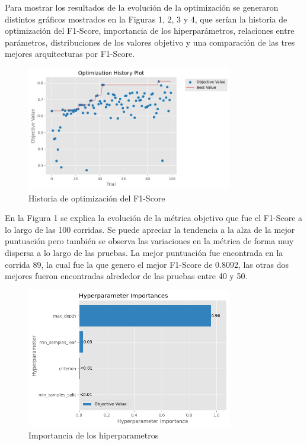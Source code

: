 \documentclass[12pt,a4paper]{article}
\begin{document}
Para mostrar los resultados de la evolución de la optimización se generaron distintos gráficos mostrados en la Figuras 1, 2, 3 y 4,
que serían la historia de optimización del F1-Score, importancia de los hiperparámetros,
relaciones entre parámetros, distribuciones de los valores objetivo y una comparación de las tres mejores arquitecturas por F1-Score.

\begin{figure}[H]
  \centering
  \includegraphics[width=0.8\textwidth]{../img/OptimizationHistory.png}
  \caption{Historia de optimización del F1-Score}\label{fig:decison-tree-optimization-history}
\end{figure}

En la Figura 1 se explica la evolución de la métrica objetivo que fue el F1-Score a lo largo de las 100 corridas.
Se puede apreciar la tendencia a la alza de la mejor puntuación pero también se observa las variaciones en la
métrica de forma muy dispersa a lo largo de las pruebas.
La mejor puntuación fue encontrada en la corrida 89, la cual fue la que genero el mejor F1-Score de 0.8092, las otras dos
mejores fueron encontradas alrededor de las pruebas entre 40 y 50.

\begin{figure}[H]
  \centering
  \includegraphics[width=0.8\textwidth]{../img/HyperparameterImportance.png}
  \caption{Importancia de los hiperparametros}\label{fig:decison-tree-hyperparameter-importance}
\end{figure}
\end{document}
